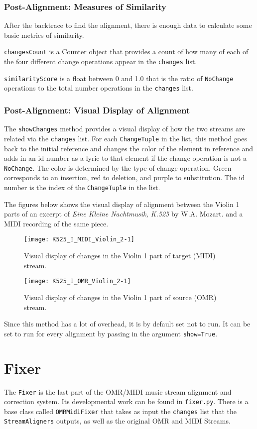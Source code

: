 \subsubsection{Post-Alignment: Measures of Similarity}
After the backtrace to find the alignment, there is enough data to calculate some basic metrics of similarity. 

\texttt{changesCount} is a Counter object that provides a count of how many of each of the four different change operations appear in the \texttt{changes} list. 

\texttt{similarityScore} is a float between 0 and 1.0 that is the ratio of \texttt{NoChange} operations to the total number operations in the \texttt{changes} list.
\subsubsection{Post-Alignment: Visual Display of Alignment}
The \texttt{showChanges} method provides a visual display of how the two streams are related via the \texttt{changes} list. For each \texttt{ChangeTuple} in the list, this method goes back to the initial reference and changes the color of the element in reference and adds in an id number as a lyric to that element if the change operation is not a \texttt{NoChange}. The color is determined by the type of change operation. Green corresponds to an insertion, red to deletion, and purple to substitution. The id number is the index of the \texttt{ChangeTuple} in the list. 

The figures below shows the visual display of alignment between the Violin 1 parts of an excerpt of \textit{Eine Kleine Nachtmusik, K.525} by W.A. Mozart. and a MIDI recording of the same piece.
\begin{figure}[H]
\centering
\texttt{[image: K525\_I\_MIDI\_Violin\_2-1]}
\caption{Visual display of changes in the Violin 1 part of target (MIDI) stream.}
\end{figure}

\begin{figure}[H]
\centering
\texttt{[image: K525\_I\_OMR\_Violin\_2-1]}
\caption{Visual display of changes in the Violin 1 part of source (OMR) stream.}
\end{figure}

Since this method has a lot of overhead, it is by default set not to run. It can be set to run for every alignment by passing in the argument \texttt{show=True}. 

\section{Fixer} \label{fixer}
The \texttt{Fixer} is the last part of the OMR/MIDI music stream alignment and correction system. Its developmental work can be found in \texttt{fixer.py}. There is a base class called \texttt{OMRMidiFixer} that takes as input the \texttt{changes} list that the \texttt{StreamAligners} outputs, as well as the original OMR and MIDI Streams.

